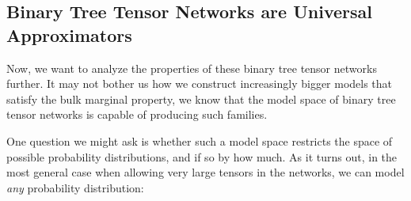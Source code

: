 \documentclass[../../main.tex]{subfiles}
\begin{document}
\subsection{Binary Tree Tensor Networks are Universal Approximators}
    Now, we want to analyze the properties of these binary tree tensor networks further. It may not bother us how we construct increasingly bigger models that satisfy the bulk marginal property, we know that the model space of binary tree tensor networks is capable of producing such families.

    One question we might ask is whether such a model space restricts the space of possible probability distributions, and if so by how much. As it turns out, in the most general case when allowing very large tensors in the networks, we can model \emph{any} probability distribution:
\end{document}
